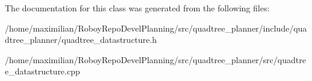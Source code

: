 The documentation for this class was generated from the following files\+:\begin{DoxyCompactItemize}
\item 
/home/maximilian/\+Roboy\+Repo\+Devel\+Planning/src/quadtree\+\_\+planner/include/quadtree\+\_\+planner/quadtree\+\_\+datastructure.\+h\item 
/home/maximilian/\+Roboy\+Repo\+Devel\+Planning/src/quadtree\+\_\+planner/src/quadtree\+\_\+datastructure.\+cpp\end{DoxyCompactItemize}
